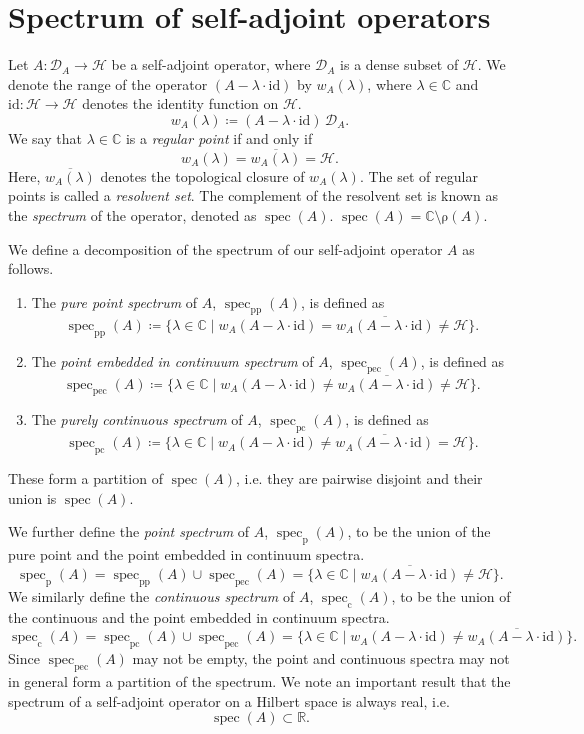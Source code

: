 \documentclass[a4 paper]{article}
\theoremstyle{definition}
\newcommand{\rr}{\mathbb{R}}
\newcommand{\cc}{\mathbb{C}}
\newcommand{\hilbert}{\mathcal{H}}
\newcommand{\domain}{\mathcal{D}}
\newcommand{\identity}{\mathrm{id}}
\newcommand{\w}{w}
\DeclareMathOperator{\spec}{spec}
\newcommand{\resolvent}{\mathup{\rho}}
\begin{document}
	\section{Spectrum of self-adjoint operators}

	Let $A \colon \domain_A \rightarrow \hilbert$ be a self-adjoint operator, where $\domain_A$ is a dense subset of $\hilbert$. We denote the range of the operator $(A - \lambda \cdot \identity)$ by $\w_A(\lambda)$, where $\lambda \in \cc$ and $\identity \colon \hilbert \rightarrow \hilbert$ denotes the identity function on $\hilbert$.
	\[
	\w_A(\lambda) \coloneq (A - \lambda \cdot \identity)\,\domain_A.
	\]
	We say that $\lambda \in \cc$ is a \textit{regular point} if and only if
	\[
		\w_A(\lambda) = \overline{\w_A(\lambda)} = \hilbert.
	\]
	Here, $\overline{\w_A(\lambda)}$ denotes the topological closure of $\w_A(\lambda)$. The set of regular points is called a \textit{resolvent set}. The complement of the resolvent set is known as the \textit{spectrum} of the operator, denoted as $\spec(A)$. $\spec(A) = \cc \setminus \resolvent(A)$.

	We define a decomposition of the spectrum of our self-adjoint operator $A$ as follows.
	\begin{enumerate}
		\item The \textit{pure point spectrum} of $A$, $\spec_\text{pp}(A)$, is defined as
		\[
			\spec_\text{pp}(A) \coloneq \{\lambda \in \cc \mid \w_A(A - \lambda \cdot \identity) = \overline{\w_A(A - \lambda \cdot \identity)} \neq \hilbert\}.
		\]
		\item The \textit{point embedded in continuum spectrum} of $A$, $\spec_\text{pec}(A)$, is defined as
		\[
			\spec_\text{pec}(A) \coloneq \{\lambda \in \cc \mid \w_A(A - \lambda \cdot \identity) \neq \overline{\w_A(A - \lambda \cdot \identity)} \neq \hilbert\}.
		\]
		\item The \textit{purely continuous spectrum} of $A$, $\spec_\text{pc}(A)$, is defined as
		\[
			\spec_\text{pc}(A) \coloneq \{\lambda \in \cc \mid \w_A(A - \lambda \cdot \identity) \neq \overline{\w_A(A - \lambda \cdot \identity)} = \hilbert\}.
		\]
	\end{enumerate}
	These form a partition of $\spec(A)$, i.e. they are pairwise disjoint and their union is $\spec(A)$.

	We further define the \textit{point spectrum} of $A$, $\spec_\mathrm{p}(A)$, to be the union of the pure point and the point embedded in continuum spectra.
	\[
		\spec_\mathrm{p}(A) =  \spec_\text{pp}(A) \cup \spec_\text{pec}(A) = \{\lambda \in \cc \mid\overline{\w_A(A - \lambda \cdot \identity)} \neq \hilbert\}.
	\]
	We similarly define the \textit{continuous spectrum} of $A$, $\spec_\text{c} (A)$, to be the union of the continuous and the point embedded in continuum spectra.
	\[
		\spec_\mathrm{c}(A) =  \spec_\text{pc}(A) \cup \spec_\text{pec}(A) = \{\lambda \in \cc \mid \w_A(A - \lambda \cdot \identity) \neq \overline{\w_A(A - \lambda \cdot \identity)}\}.
	\]
	Since $\spec_\text{pec}(A)$ may not be empty, the point and continuous spectra may not in general form a partition of the spectrum. We note an important result that the spectrum of a self-adjoint operator on a Hilbert space is always real, i.e.
	\[
		\spec(A) \subset \rr.
	\]
\end{document}
